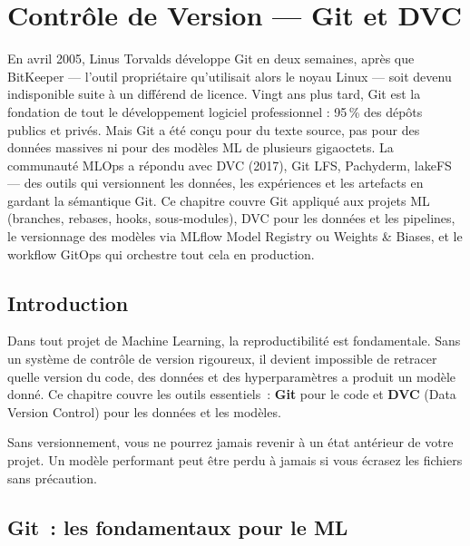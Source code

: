 \chapter{Contr\^ole de Version --- Git et DVC}
\label{ch:version-control}

En avril 2005, Linus Torvalds développe Git en deux semaines, après que BitKeeper --- l'outil propriétaire qu'utilisait alors le noyau Linux --- soit devenu indisponible suite à un différend de licence. Vingt ans plus tard, Git est la fondation de tout le développement logiciel professionnel : 95\,\% des dépôts publics et privés. Mais Git a été conçu pour du texte source, pas pour des données massives ni pour des modèles ML de plusieurs gigaoctets. La communauté MLOps a répondu avec DVC (2017), Git LFS, Pachyderm, lakeFS --- des outils qui versionnent les données, les expériences et les artefacts en gardant la sémantique Git. Ce chapitre couvre Git appliqué aux projets ML (branches, rebases, hooks, sous-modules), DVC pour les données et les pipelines, le versionnage des modèles via MLflow Model Registry ou Weights \& Biases, et le workflow GitOps qui orchestre tout cela en production.

\section{Introduction}

Dans tout projet de Machine Learning, la reproductibilit\'e est fondamentale.
Sans un syst\`eme de contr\^ole de version rigoureux, il devient impossible de
retracer quelle version du code, des donn\'ees et des hyperparam\`etres a produit
un mod\`ele donn\'e. Ce chapitre couvre les outils essentiels~: \textbf{Git} pour
le code et \textbf{DVC} (Data Version Control) pour les donn\'ees et les mod\`eles.

\begin{attention}[title=\textbf{Le pi\`ege du <<~c'\'etait mieux avant~>>}]
Sans versionnement, vous ne pourrez jamais revenir \`a un \'etat ant\'erieur de
votre projet. Un mod\`ele performant peut \^etre perdu \`a jamais si vous \'ecrasez
les fichiers sans pr\'ecaution.
\end{attention}

\section{Git~: les fondamentaux pour le ML}
\label{sec:git-essentials}


